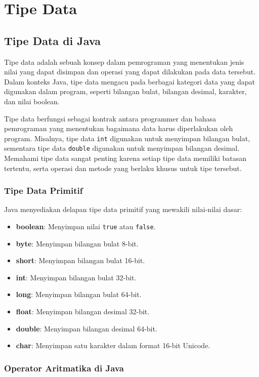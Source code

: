 \chapter{Tipe Data}
 
\section{Tipe Data di Java}

Tipe data adalah sebuah konsep dalam pemrograman yang menentukan jenis nilai yang dapat disimpan dan operasi yang dapat dilakukan pada data tersebut. Dalam konteks Java, tipe data mengacu pada berbagai kategori data yang dapat digunakan dalam program, seperti bilangan bulat, bilangan desimal, karakter, dan nilai boolean.

Tipe data berfungsi sebagai kontrak antara programmer dan bahasa pemrograman yang menentukan bagaimana data harus diperlakukan oleh program. Misalnya, tipe data \texttt{int} digunakan untuk menyimpan bilangan bulat, sementara tipe data \texttt{double} digunakan untuk menyimpan bilangan desimal. Memahami tipe data sangat penting karena setiap tipe data memiliki batasan tertentu, serta operasi dan metode yang berlaku khusus untuk tipe tersebut.

\subsection{Tipe Data Primitif}
Java menyediakan delapan tipe data primitif yang mewakili nilai-nilai dasar:

\begin{itemize}
	\item \textbf{boolean}: Menyimpan nilai \texttt{true} atau \texttt{false}.
	\item \textbf{byte}: Menyimpan bilangan bulat 8-bit.
	\item \textbf{short}: Menyimpan bilangan bulat 16-bit.
	\item \textbf{int}: Menyimpan bilangan bulat 32-bit.
	\item \textbf{long}: Menyimpan bilangan bulat 64-bit.
	\item \textbf{float}: Menyimpan bilangan desimal 32-bit.
	\item \textbf{double}: Menyimpan bilangan desimal 64-bit.
	\item \textbf{char}: Menyimpan satu karakter dalam format 16-bit Unicode.
\end{itemize}

\subsection{Operator Aritmatika di Java}

